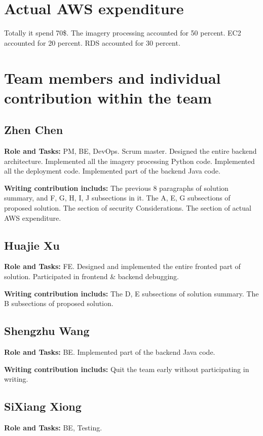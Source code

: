 \documentclass[conference]{IEEEtran}
\begin{document}
\section{Actual AWS expenditure}

Totally it spend 70\$. The imagery processing accounted for 50 percent. EC2 accounted for 20 percent. RDS accounted for 30 percent.

\section{Team members and individual contribution within the team}

\subsection{Zhen Chen}
\textbf{Role and Tasks:} PM, BE, DevOps. Scrum master. Designed the entire backend architecture. 
    Implemented all the imagery processing Python code. Implemented all the deployment code. 
    Implemented part of the backend Java code. 

\textbf{Writing contribution includs:} The previous 8 paragraphs of solution summary, and F, G, H, I, J 
    subsections in it. The A, E, G subsections of proposed solution. The section of security 
    Considerations. The section of actual AWS expenditure.

\subsection{Huajie Xu} 
\textbf{Role and Tasks:} FE. Designed and implemented the entire fronted part of solution. Participated in frontend & backend debugging.

\textbf{Writing contribution includs:} The D, E subsections of solution summary. The B subsections of proposed solution.

\subsection{Shengzhu Wang}
\textbf{Role and Tasks:} BE. Implemented part of the backend Java code. 
 
\textbf{Writing contribution includs:} Quit the team early without participating in writing.

\subsection{SiXiang Xiong}
\textbf{Role and Tasks:} BE, Testing.
\end{document}
